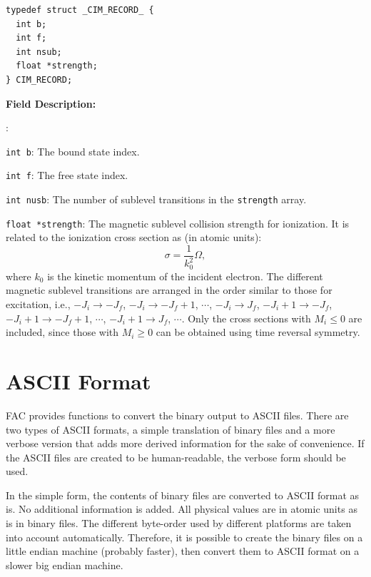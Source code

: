 \documentclass[twoside,letterpaper]{refrep}
\newenvironment{dbdesc}{\textbf{Field Description:} \begin{list}
	{:}{\setlength{\labelwidth}{2in}
	   \setlength{\leftmargin}{2in}
	   \setlength{\labelsep}{0.1in}
	   \setlength{\rightmargin}{0.2in}}}
	{\end{list}}
\begin{document}
\begin{verbatim}
typedef struct _CIM_RECORD_ {
  int b;
  int f;
  int nsub;
  float *strength;
} CIM_RECORD;
\end{verbatim}

\begin{dbdesc}
\item[\texttt{int b}:] The bound state index.
\item[\texttt{int f}:] The free state index.
\item[\texttt{int nusb}:] The number of sublevel transitions in the
  \texttt{strength} array. 
\item[\texttt{float *strength}:] The magnetic sublevel collision strength for
  ionization. It is related to the ionization cross section as (in atomic
  units): 
\begin{equation}
\sigma = \frac{1}{k_0^2}\Omega,
\end{equation}
where ${k_0}$ is the kinetic momentum of the incident electron. The different
magnetic sublevel transitions are arranged in the order similar to those for
excitation, i.e., $-J_i\to -J_f$, $-J_i\to -J_f+1$, $\cdots$, $-J_i\to J_f$,
$-J_i+1\to -J_f$, $-J_i+1\to -J_f+1$, $\cdots$, $-J_i+1\to J_f$,
$\cdots$. Only the cross sections with $M_i \le 0$ are included, since those
with $M_i \ge 0$ can be obtained using time reversal symmetry.

\end{dbdesc}

\section{ASCII Format}
FAC provides functions to convert the binary output to ASCII files. There are
two types of ASCII formats, a simple translation of binary files and a more
verbose version that adds more derived information for the sake of
convenience. If the ASCII files are created to be human-readable, the
verbose form should be used.

In the simple form, the contents of binary files are converted to ASCII format
as is. No additional information is added. All physical values are in atomic
units as is in binary files. The different byte-order used by different
platforms are taken into account automatically. Therefore, it is possible to
create the binary files on a little endian machine (probably faster), then
convert them to ASCII format on a slower big endian machine.
\end{document}
